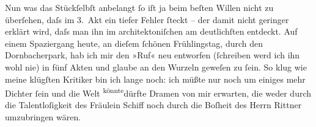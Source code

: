 \pstart
           Nun was das Stückſelbſt anbelangt ſo iſt ja beim beſten Willen nicht
               zu überſehen, daſs im 3. Akt
               ein {\pb}tiefer Fehler ſteckt – der damit nicht geringer
               erklärt wird, daſs man ihn \introOben{}im\introOben{} architektoniſchen am
               deutlichſten entdeckt. Auf einem Spaziergang heute, an dieſem ſchönen Frühlingstag,
               durch den Dornbacherpark, hab ich mir den »Ruf« neu entworfen (ſchreiben werd ich ihn wohl
               nie) in fünf Akten und glaube an den Wurzeln geweſen zu ſein. So klug wie meine
               klügſten Kritiker bin ich lange noch: ich müßte {\pb}nur
               noch um einiges mehr Dichter ſein und die Welt \substVorne{}\textsuperscript{könnte}\substDazwischen{}dürfte\substHinten{} Dramen von mir erwarten, die weder durch die Talentloſigkeit des Fräulein
                  Schiff noch durch die Boſheit des Herrn Rittner umzubringen wären.\pend
           
